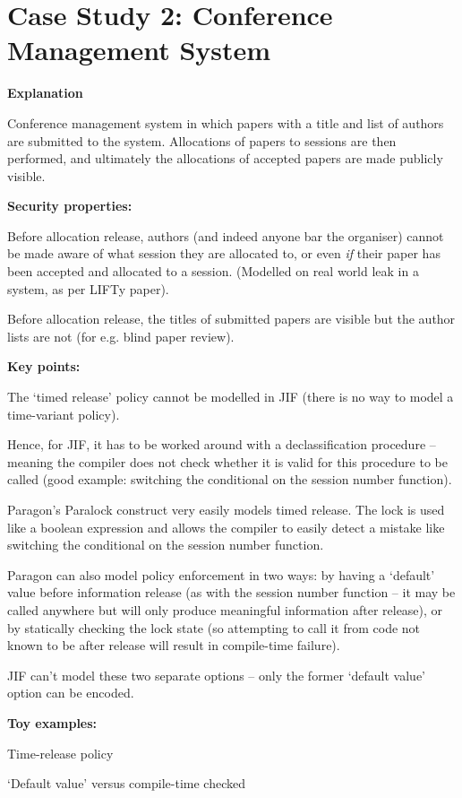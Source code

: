 \section{Case Study 2: Conference Management System}

\textbf{Explanation}

Conference management system in which papers with a title and list of authors are submitted to the system. Allocations of papers to sessions are then performed, and ultimately the allocations of accepted papers are made publicly visible.

\textbf{Security properties:}

Before allocation release, authors (and indeed anyone bar the organiser) cannot be made aware of what session they are allocated to, or even \textit{if} their paper has been accepted and allocated to a session. (Modelled on real world leak in a system, as per LIFTy paper).

Before allocation release, the titles of submitted papers are visible but the author lists are not (for e.g. blind paper review).

\textbf{Key points:}

The `timed release' policy cannot be modelled in JIF (there is no way to model a time-variant policy).

Hence, for JIF, it has to be worked around with a declassification procedure -- meaning the compiler does not check whether it is valid for this procedure to be called (good example: switching the conditional on the session number function).

Paragon's Paralock construct very easily models timed release. The lock is used like a boolean expression and allows the compiler to easily detect a mistake like switching the conditional on the session number function.

Paragon can also model policy enforcement in two ways: by having a `default' value before information release (as with the session number function -- it may be called anywhere but will only produce meaningful information after release), or by statically checking the lock state (so attempting to call it from code not known to be after release will result in compile-time failure).

JIF can't model these two separate options -- only the former `default value' option can be encoded.

\textbf{Toy examples:}

Time-release policy

`Default value' versus compile-time checked
